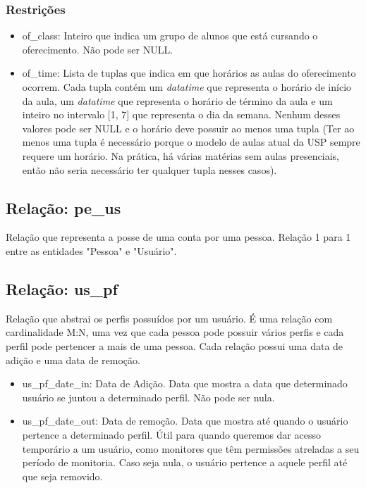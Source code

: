 \documentclass{article}
\begin{document}
  	    \subsubsection{Restrições}
  	        \begin{itemize}
  	            \item of\_class: Inteiro que indica um grupo de alunos que está cursando o oferecimento. Não pode ser NULL.
  	            \item of\_time: Lista de tuplas que indica em que horários as aulas do oferecimento ocorrem. Cada tupla contém um \textit{datatime} que representa o horário de início da aula, um \textit{datatime} que representa o horário de término da aula e um inteiro no intervalo [1, 7] que representa o dia da semana. Nenhum desses valores pode ser NULL e o horário deve possuir ao menos uma tupla (Ter ao menos uma tupla é necessário porque o modelo de aulas atual da USP sempre requere um horário. Na prática, há várias matérias sem aulas presenciais, então não seria necessário ter qualquer tupla nesses casos).
  	         \end{itemize}
  	    
  	\subsection{Relação: pe\_us}
  	    \quad Relação que representa a posse de uma conta por uma pessoa. Relação 1 para 1 entre as entidades "Pessoa" e "Usuário".
  	    
  	\subsection{Relação: us\_pf}
  	    \quad Relação que abstrai os perfis possuídos por um usuário. É uma relação com cardinalidade M:N, uma vez que cada pessoa pode possuir vários perfis e cada perfil pode pertencer a mais de uma pessoa.
  	    \quad Cada relação possui uma data de adição e uma data de remoção.
  	    \begin{itemize}
  	        \item us\_pf\_date\_in: Data de Adição. Data que mostra a data que determinado usuário se juntou a determinado perfil. Não pode ser nula.
  	        \item us\_pf\_date\_out: Data de remoção. Data que mostra até quando o usuário pertence a determinado perfil. Útil para quando queremos dar acesso temporário a um usuário, como monitores que têm permissões atreladas a seu período de monitoria. Caso seja nula, o usuário pertence a aquele perfil até que seja removido.
  	    \end{itemize}
  	    
\end{document}
